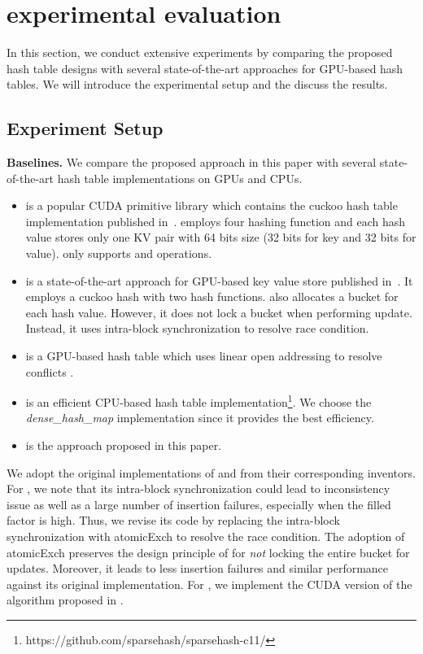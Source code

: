 \section{experimental evaluation}\label{sec:exp}
In this section, we conduct extensive experiments by comparing the proposed hash table designs with several state-of-the-art approaches for GPU-based hash tables. 
We will introduce the experimental setup and the discuss the results. 

\subsection{Experiment Setup}\label{sec:exp:setup}

\vspace{1mm}\noindent\textbf{Baselines.} We compare the proposed approach in this paper with several state-of-the-art hash table implementations on GPUs and CPUs. 
\begin{itemize}
	\item \cudpp is a popular CUDA primitive library which contains the cuckoo hash table implementation published in~\cite{alcantara2009real}. 
	\cudpp employs four hashing function and each hash value stores only one KV pair with 64 bits size (32 bits for key and 32 bits for value). 
	\cudpp only supports  and  operations. 
	\item \megakv is a state-of-the-art approach for GPU-based key value store published in~\cite{zhang2015mega}. It employs a cuckoo hash with two hash functions.
	\megakv also allocates a bucket for each hash value. However, it does not lock a bucket when performing update. Instead, it uses intra-block synchronization to resolve race condition. 
	\item \linear is a GPU-based hash table which uses linear open addressing to resolve conflicts \cite{hong2010mapcg}. 
	\item \google is an efficient CPU-based hash table implementation\footnote{https://github.com/sparsehash/sparsehash-c11/}. We choose the \emph{dense\_hash\_map} implementation since it provides the best efficiency.
	\item \voter is the approach proposed in this paper.
\end{itemize}
We adopt the original implementations of \cudpp and \google from their corresponding inventors. 
For \megakv, we note that its intra-block synchronization could lead to inconsistency issue as well as a large number of insertion failures, especially when the filled factor is high.  
Thus, we revise its code by replacing the intra-block synchronization with atomicExch to resolve the race condition. The adoption of atomicExch preserves the design principle of \megakv for \emph{not} locking the entire bucket for updates. Moreover, it leads to less insertion failures and similar performance against its original implementation. 
For \linear, we implement the CUDA version of the algorithm proposed in \cite{hong2010mapcg}.

